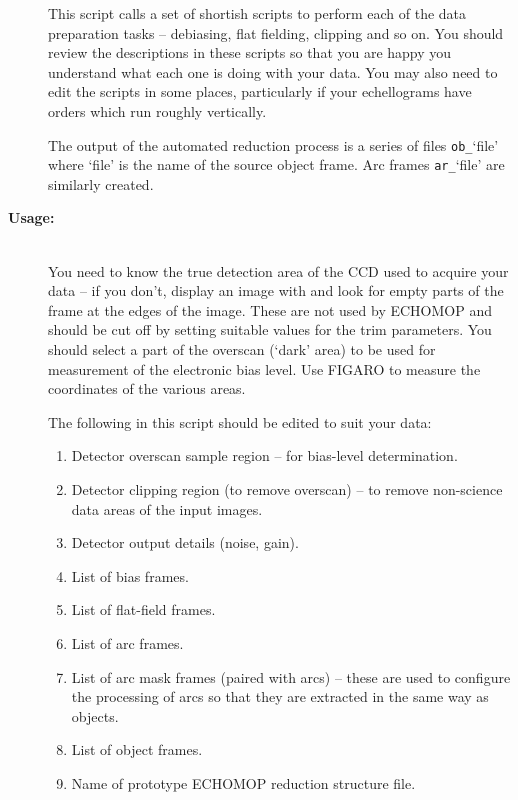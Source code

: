 \documentclass[twoside,11pt]{starlink}
\providecommand{\scspec}[2]{#1}
\begin{document}
\begin{description}
     This script calls a set of shortish scripts to perform each of the
     data preparation tasks \scspec{--}{-} debiasing, flat fielding,
     clipping and so on.
     You should review the descriptions in these scripts so that you are
     happy you understand what each one is doing with your data.  You may
     also need to edit the scripts in some places, particularly if your
     echellograms have orders which run roughly vertically.

     The output of the automated reduction process is a series of
     files \verb+ob_+`file' where `file' is the name of the source object
     frame.
     Arc frames \verb+ar_+`file' are similarly created.

\item [\textbf{Usage:}] \mbox{} \\
     You need to know the true detection area of the CCD used to acquire
     your data \scspec{--}{-} if you don't, display an image with
       and
     look for empty parts of the frame at the edges of the image.
     These are not used by ECHOMOP and should be cut off by setting
     suitable values for the trim parameters.  You should select a part
     of the overscan (`dark' area) to be used for measurement of the
     electronic bias level.
     Use FIGARO  to measure the coordinates of the
     various areas.

     The following in this script should be edited to suit your data:

\begin{enumerate}

\item Detector overscan sample region \scspec{--}{-} for bias-level
      determination.
\item Detector clipping region (to remove overscan) \scspec{--}{-} to remove
      non-science data areas of the input images.
\item Detector output details (noise, gain).
\item List of bias frames.
\item List of flat-field frames.
\item List of arc frames.
\item List of arc mask frames (paired with arcs) \scspec{--}{-} these are
      used to configure the processing of arcs so that they are extracted
      in the same way as objects.
\item List of object frames.
\item Name of prototype ECHOMOP reduction structure file.


\end{enumerate}
\end{description}
\end{document}
